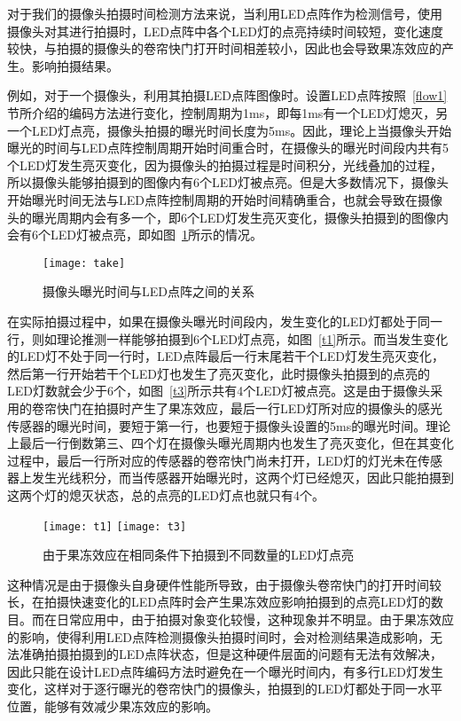对于我们的摄像头拍摄时间检测方法来说，当利用LED点阵作为检测信号，使用摄像头对其进行拍摄时，LED点阵中各个LED灯的点亮持续时间较短，变化速度较快，与拍摄的摄像头的卷帘快门打开时间相差较小，因此也会导致果冻效应的产生。影响拍摄结果。

例如，对于一个摄像头，利用其拍摄LED点阵图像时。设置LED点阵按照~\ref{flow1}节所介绍的编码方法进行变化，控制周期为1ms，即每1ms有一个LED灯熄灭，另一个LED灯点亮，摄像头拍摄的曝光时间长度为5ms。因此，理论上当摄像头开始曝光的时间与LED点阵控制周期开始时间重合时，在摄像头的曝光时间段内共有5个LED灯发生亮灭变化，因为摄像头的拍摄过程是时间积分，光线叠加的过程，所以摄像头能够拍摄到的图像内有6个LED灯被点亮。但是大多数情况下，摄像头开始曝光时间无法与LED点阵控制周期的开始时间精确重合，也就会导致在摄像头的曝光周期内会有多一个，即6个LED灯发生亮灭变化，摄像头拍摄到的图像内会有6个LED灯被点亮，即如图~\ref{take}所示的情况。

\begin{figure}[h] 
  \centering
  \texttt{[image: take]}
  \caption{摄像头曝光时间与LED点阵之间的关系}
  \label{take}
\end{figure}

在实际拍摄过程中，如果在摄像头曝光时间段内，发生变化的LED灯都处于同一行，则如理论推测一样能够拍摄到6个LED灯点亮，如图~\ref{t1}所示。而当发生变化的LED灯不处于同一行时，LED点阵最后一行末尾若干个LED灯发生亮灭变化，然后第一行开始若干个LED灯也发生了亮灭变化，此时摄像头拍摄到的点亮的LED灯数就会少于6个，如图~\ref{t3}所示共有4个LED灯被点亮。这是由于摄像头采用的卷帘快门在拍摄时产生了果冻效应，最后一行LED灯所对应的摄像头的感光传感器的曝光时间，要短于第一行，也要短于摄像头设置的5ms的曝光时间。理论上最后一行倒数第三、四个灯在摄像头曝光周期内也发生了亮灭变化，但在其变化过程中，最后一行所对应的传感器的卷帘快门尚未打开，LED灯的灯光未在传感器上发生光线积分，而当传感器开始曝光时，这两个灯已经熄灭，因此只能拍摄到这两个灯的熄灭状态，总的点亮的LED灯点也就只有4个。

\begin{figure}[h]
  \centering%
    {\texttt{[image: t1]}}
      {\texttt{[image: t3]}}
  \caption{由于果冻效应在相同条件下拍摄到不同数量的LED灯点亮}
  \label{t}
\end{figure}

这种情况是由于摄像头自身硬件性能所导致，由于摄像头卷帘快门的打开时间较长，在拍摄快速变化的LED点阵时会产生果冻效应影响拍摄到的点亮LED灯的数目。而在日常应用中，由于拍摄对象变化较慢，这种现象并不明显。由于果冻效应的影响，使得利用LED点阵检测摄像头拍摄时间时，会对检测结果造成影响，无法准确拍摄拍摄到的LED点阵状态，但是这种硬件层面的问题有无法有效解决，因此只能在设计LED点阵编码方法时避免在一个曝光时间内，有多行LED灯发生变化，这样对于逐行曝光的卷帘快门的摄像头，拍摄到的LED灯都处于同一水平位置，能够有效减少果冻效应的影响。

